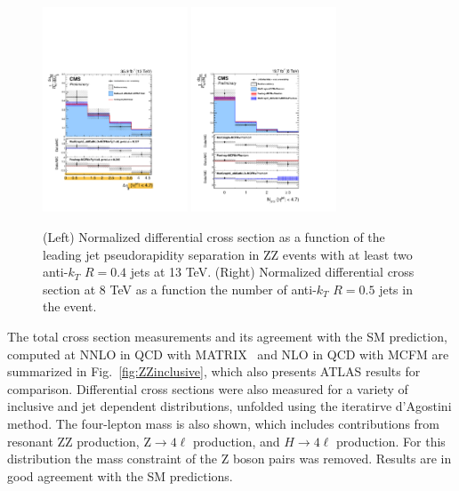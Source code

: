 \documentclass[10pt]{article}
\begin{document}
\begin{figure}[htb]
  \centering
    \includegraphics[height=2.4in]{figures/ZZ_13TeV_dEtajj_unfolded.pdf}
    \includegraphics[height=2.4in]{figures/ZZ_8TeV_nJets_unfolded.pdf}
  \caption{(Left) Normalized differential cross section as a function of the
          leading jet pseudorapidity separation in ZZ events with at least
          two anti-$k_{T}$ $R=0.4$ jets at 13 TeV. 
          (Right) Normalized differential cross section at 8 TeV
          as a function the number of anti-$k_{T}$ $R=0.5$ jets in the event.}
  \label{fig:ZZjets}
\end{figure}
The total cross section measurements and its agreement with the SM
prediction, computed at NNLO in QCD with MATRIX~\cite{Cascioli:2014yka}\cite{Grazzini:2015hta} 
and NLO in QCD with MCFM
are summarized in Fig.~\ref{fig:ZZinclusive}, which also presents ATLAS results for comparison. 
Differential cross sections were also measured for a variety of inclusive 
and jet dependent distributions, unfolded using the iteratirve d'Agostini method. 
The four-lepton mass is also shown, which includes contributions 
from resonant ZZ production, Z$\rightarrow 4\ell$ production, and $H \rightarrow 4\ell$ production. 
For this distribution the mass constraint of the Z boson pairs was removed.
Results are in good agreement with the SM predictions.
\end{document}
